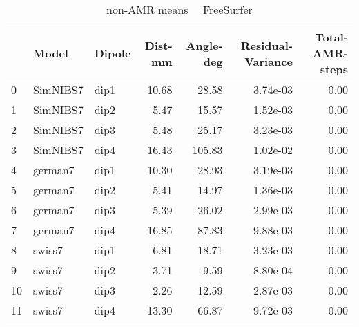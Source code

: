 \documentclass{article}
\begin{document}
\begin{table}
\begin{tabular}{lllrrrr}
\toprule
& Model& Dipole& Dist-mm& Angle-deg& Residual-Variance& Total-AMR-steps\\
\midrule
\rowcolor{lightgray}0 & SimNIBS7 & dip1 & 10.68 & 28.58 & 3.74e-03 & 0.00\\
\rowcolor{lightgray}1 & SimNIBS7 & dip2 & 5.47 & 15.57 & 1.52e-03 & 0.00\\
\rowcolor{lightgray}2 & SimNIBS7 & dip3 & 5.48 & 25.17 & 3.23e-03 & 0.00\\
\rowcolor{lightgray}3 & SimNIBS7 & dip4 & 16.43 & 105.83 & 1.02e-02 & 0.00\\
\rowcolor{yellow}4 & german7 & dip1 & 10.30 & 28.93 & 3.19e-03 & 0.00\\
\rowcolor{yellow}5 & german7 & dip2 & 5.41 & 14.97 & 1.36e-03 & 0.00\\
\rowcolor{yellow}6 & german7 & dip3 & 5.39 & 26.02 & 2.99e-03 & 0.00\\
\rowcolor{yellow}7 & german7 & dip4 & 16.85 & 87.83 & 9.88e-03 & 0.00\\
\rowcolor{pink}8 & swiss7 & dip1 & 6.81 & 18.71 & 3.23e-03 & 0.00\\
\rowcolor{pink}9 & swiss7 & dip2 & 3.71 & 9.59 & 8.80e-04 & 0.00\\
\rowcolor{pink}10 & swiss7 & dip3 & 2.26 & 12.59 & 2.87e-03 & 0.00\\
\rowcolor{pink}11 & swiss7 & dip4 & 13.30 & 66.87 & 9.72e-03 & 0.00\\
\end{tabular}
\caption{non-AMR means \ \textemdash \ FreeSurfer}
\end{table}
\end{document}
